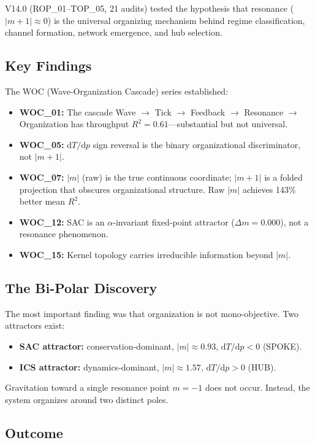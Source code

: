 \documentclass[11pt,a4paper,oneside]{report}
\newcommand{\dTdp}{\ensuremath{\mathrm{d}T/\mathrm{d}p}}
\begin{document}
V14.0 (ROP\_01--TOP\_05, 21 audits) tested the hypothesis that resonance
($|m+1|\approx 0$) is the universal organizing mechanism behind regime
classification, channel formation, network emergence, and hub selection.

\subsection{Key Findings}

The WOC (Wave-Organization Cascade) series established:
\begin{itemize}[nosep]
  \item \textbf{WOC\_01:} The cascade Wave $\rightarrow$ Tick $\rightarrow$
    Feedback $\rightarrow$ Resonance $\rightarrow$ Organization has
    throughput $R^2 = 0.61$---substantial but not universal.
  \item \textbf{WOC\_05:} $\dTdp$ sign reversal is the binary organizational
    discriminator, not $|m+1|$.
  \item \textbf{WOC\_07:} $|m|$ (raw) is the true continuous coordinate;
    $|m+1|$ is a folded projection that obscures organizational structure.
    Raw $|m|$ achieves 143\% better mean $R^2$.
  \item \textbf{WOC\_12:} SAC is an $\alpha$-invariant fixed-point attractor
    ($\Delta m = 0.000$), not a resonance phenomenon.
  \item \textbf{WOC\_15:} Kernel topology carries irreducible information
    beyond $|m|$.
\end{itemize}

\subsection{The Bi-Polar Discovery}

The most important finding was that organization is not mono-objective.
Two attractors exist:
\begin{itemize}[nosep]
  \item \textbf{SAC attractor:} conservation-dominant, $|m|\approx 0.93$,
    $\dTdp < 0$ (SPOKE).
  \item \textbf{ICS attractor:} dynamics-dominant, $|m|\approx 1.57$,
    $\dTdp > 0$ (HUB).
\end{itemize}

Gravitation toward a single resonance point $m=-1$ does not occur.
Instead, the system organizes around two distinct poles.

\subsection{Outcome}
\end{document}
